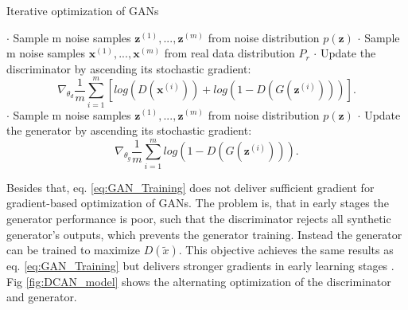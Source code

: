 \begin{algorithm}
\caption{Iterative optimization of GANs}\label{alg:cap}
\begin{algorithmic}
        \State $\cdot$ Sample m noise samples ${\pmb{z}^{(1)}, . . . , \pmb{z}^{(m)}}$ from noise distribution $p(\pmb{z})$
        \State $\cdot$ Sample m noise samples ${\pmb{x}^{(1)}, . . . , \pmb{x}^{(m)}}$ from real data distribution $P_{r}$
        \State $\cdot$ Update the discriminator by ascending its stochastic gradient:
        \begin{equation*}
            \nabla_{\theta_{d}} \frac{1}{m} \sum_{i=1}^{m} [log(D(\pmb{x}^{(i)})) + log(1-D(G(\pmb{z}^{(i)})))].
        \end{equation*}
    \EndWhile
    \State $\cdot$ Sample m noise samples ${\pmb{z}^{(1)}, . . . , \pmb{z}^{(m)}}$ from noise distribution $p(\pmb{z})$
    \State $\cdot$ Update the generator by ascending its stochastic gradient:
    \begin{equation*}
        \nabla_{\theta_{g}} \frac{1}{m} \sum_{i=1}^{m} log(1-D(G(\pmb{z}^{(i)}))).
    \end{equation*}
\EndWhile
\label{alg.GAN_optimization}
\end{algorithmic}
\end{algorithm}

Besides that, eq. \ref{eq:GAN_Training} does not deliver sufficient gradient for gradient-based optimization of GANs. The problem is, that in early stages the generator performance is poor, such that the discriminator rejects all synthetic generator's outputs, which prevents the generator training. Instead the generator can be trained to maximize $D(\tilde{x})$. This objective achieves the same results as eq. \ref{eq:GAN_Training} but delivers stronger gradients in early learning stages \cite{Goodfellow2014}. Fig \ref{fig:DCAN_model} shows the alternating optimization of the discriminator and generator. 

